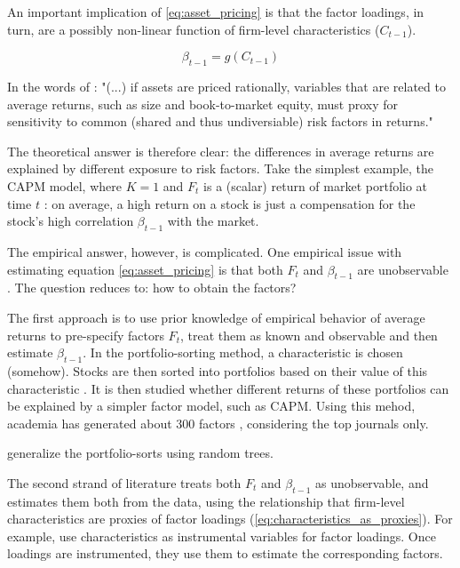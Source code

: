 	An important implication of \ref{eq:asset_pricing} is that the factor loadings, in turn, are a possibly non-linear function of firm-level characteristics ($C_{t-1}$). 
		
		\begin{equation}
			\beta_{t-1}= g(C_{t-1})\label{eq:characteristics_as_proxies}
		\end{equation}
	
	In the words of \cite{fama1993common}: "(...) if assets are priced rationally, variables that are
	related to average returns, such as size and book-to-market equity, must proxy for
	sensitivity to common (shared and thus undiversiable) risk factors in returns." 	
	
	The theoretical answer is therefore clear: the differences in average returns are explained by different exposure to risk factors. 
	Take the simplest example, the CAPM model, where $K=1$ and $F_t$ is a (scalar) return of market portfolio at time $t$ \citep{cochrane2009asset}: on average, a high return on a stock is just a compensation for the stock's high correlation $\beta_{t-1}$ with the market. 
	
	The empirical answer, however, is complicated. One empirical issue with estimating equation \ref{eq:asset_pricing} is that both $F_t$ and $\beta_{t-1}$ are unobservable \citep{kelly2019characteristics}. The question reduces to: how to obtain the factors? 
	
	The first approach is to use prior knowledge of empirical behavior of average returns to pre-specify factors $F_t$, treat them as known and observable and then estimate $\beta_{t-1}$. In the portfolio-sorting method, a characteristic is chosen (somehow). Stocks are then sorted into portfolios based on their value of this characteristic \citep{fama1993common}. It is then studied whether different returns of these portfolios can be explained by a simpler factor model, such as CAPM. Using this mehod, academia has generated about 300 factors \citep{harvey2016and}, considering the top journals only.
	
	\cite{bryzgalova2019forest} generalize the portfolio-sorts using random trees.     
	
	The second strand of literature treats both $F_t$ and $\beta_{t-1}$ as unobservable, and estimates them both from the data, using the  relationship that firm-level characteristics are proxies of factor loadings (\ref{eq:characteristics_as_proxies}). For example, \cite{kelly2019characteristics} use characteristics as instrumental variables for factor loadings. Once loadings are instrumented, they use them to estimate the corresponding factors. 
	
    
	
	

	
	   
	
	   
	



